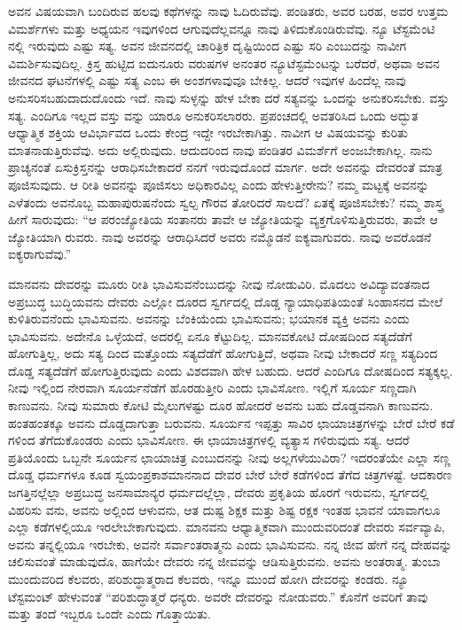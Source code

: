 ಅವನ ವಿಷಯವಾಗಿ ಬಂದಿರುವ ಹಲವು ಕಥೆಗಳನ್ನು ನಾವು ಓದಿರುವೆವು. ಪಂಡಿತರು, ಅವರ ಬರಹ, ಅವರ ಉತ್ತಮ ವಿಮರ್ಶೆಗಳು ಮತ್ತು ಅಧ್ಯಯನ ಇವುಗಳಿಂದ ಆಗುವುದೆಲ್ಲವನ್ನೂ ನಾವು ತಿಳಿದುಕೊಂಡಿರುವೆವು. ನ್ಯೂ ಟೆಸ್ಟಮೆಂಟಿ ನಲ್ಲಿ ಇರುವುದು ಎಷ್ಟು ಸತ್ಯ. ಅವನ ಜೀವನದಲ್ಲಿ ಚಾರಿತ್ರಿಕ ದೃಷ್ಟಿಯಿಂದ ಎಷ್ಟು ಸರಿ ಎಂಬುದನ್ನು ನಾವೀಗ ವಿಮರ್ಶಿಸುವುದಿಲ್ಲ. ಕ್ರಿಸ್ತ ಹುಟ್ಟಿದ ಐದುನೂರು ವರುಷಗಳ ಅನಂತರ ನ್ಯೂಟೆಸ್ಟಮೆಂಟನ್ನು ಬರೆದರೆ, ಅಥವಾ ಅವನ ಜೀವನದ ಘಟನೆಗಳಲ್ಲಿ ಎಷ್ಟು ಸತ್ಯ ಎಂಬ ಈ ಅಂಶಗಳಾವುವೂ ಬೇಕಿಲ್ಲ. ಆದರೆ ಇವುಗಳ ಹಿಂದೆಲ್ಲ ನಾವು ಅನುಸರಿಸಬಹುದಾದುದೊಂದು ಇದೆ. ನಾವು ಸುಳ್ಳನ್ನು ಹೇಳ ಬೇಕಾ ದರೆ ಸತ್ಯವನ್ನು ಒಂದನ್ನು ಅನುಕರಿಸಬೇಕು. ವಸ್ತು ಸತ್ಯ. ಎಂದಿಗೂ ಇಲ್ಲದ ವಸ್ತು ವನ್ನು ಯಾರೂ ಅನುಕರಿಸಲಾರರು. ಪ್ರಪಂಚದಲ್ಲಿ ಅವತರಿಸಿದ ಒಂದು ಅದ್ಭುತ ಆಧ್ಯಾತ್ಮಿಕ ಶಕ್ತಿಯ ಆವಿರ್ಭಾವದ ಒಂದು ಕೇಂದ್ರ ಇದ್ದೇ ಇರಬೇಕಾಗಿತ್ತು. ನಾವೀಗ ಆ ವಿಷಯವನ್ನು ಕುರಿತು ಮಾತನಾಡುತ್ತಿರುವೆವು. ಅದು ಅಲ್ಲಿರುವುದು. ಆದುದರಿಂದ ನಾವು ಪಂಡಿತರ ವಿಮರ್ಶೆಗೆ ಅಂಜಬೇಕಾಗಿಲ್ಲ. ನಾನು ಪ್ರಾಚ್ಯನಂತೆ ಏಸುಕ್ರಿಸ್ತನನ್ನು ಆರಾಧಿಸಬೇಕಾದರೆ ನನಗೆ ಇರುವುದೊಂದೆ ಮಾರ್ಗ. ಅದೇ ಅವನನ್ನು ದೇವರಂತೆ ಮಾತ್ರ ಪೂಜಿಸುವುದು. ಆ ರೀತಿ ಅವನನ್ನು ಪೂಜಿಸಲು ಅಧಿಕಾರವಿಲ್ಲ ಎಂದು ಹೇಳುತ್ತೀರೇನು? ನಮ್ಮ ಮಟ್ಟಕ್ಕೆ ಅವನನ್ನು ಎಳೆತಂದು ಅವನೊಬ್ಬ ಮಹಾಪುರುಷನೆಂದು ಸ್ವಲ್ಪ ಗೌರವ ತೋರಿದರೆ ಸಾಲದೆ? ಏತಕ್ಕೆ ಪೂಜಿಸಬೇಕು? ನಮ್ಮ ಶಾಸ್ತ್ರ ಹೀಗೆ ಸಾರುವುದು: “ಆ ಪರಂಜ್ಯೋತಿಯ ಸಂತಾನರು ತಾವೇ ಆ ಜ್ಯೋತಿಯನ್ನು ವ್ಯಕ್ತಗೊಳಿಸುತ್ತಿರುವರು, ತಾವೇ ಆ ಜ್ಯೋತಿಯಾಗಿ ರುವರು. ನಾವು ಅವರನ್ನು ಆರಾಧಿಸಿದರೆ ಅವರು ನಮ್ಮೊಡನೆ ಐಕ್ಯವಾಗುವರು. ನಾವು ಅವರೊಡನೆ ಐಕ್ಯರಾಗುವೆವು.”

ಮಾನವನು ದೇವರನ್ನು ಮೂರು ರೀತಿ ಭಾವಿಸುವನೆಂಬುದನ್ನು ನೀವು ನೋಡುವಿರಿ. ಮೊದಲು ಅವಿದ್ಯಾವಂತನಾದ ಅಪ್ರಬುದ್ಧ ಬುದ್ಧಿಯವನು ದೇವರು ಎಲ್ಲೋ ದೂರದ ಸ್ವರ್ಗದಲ್ಲಿ ದೊಡ್ಡ ನ್ಯಾಯಾಧಿಪತಿಯಂತೆ ಸಿಂಹಾಸನದ ಮೇಲೆ ಕುಳಿತಿರುವನೆಂದು ಭಾವಿಸುವನು. ಅವನನ್ನು ಬೆಂಕಿಯೆಂದು ಭಾವಿಸುವನು; ಭಯಾನಕ ವ್ಯಕ್ತಿ ಅವನು ಎಂದು ಭಾವಿಸುವನು. ಅದೇನೊ ಒಳ್ಳೆಯದೆ, ಅದರಲ್ಲಿ ಏನೂ ಕೆಟ್ಟುದಿಲ್ಲ. ಮಾನವಕೋಟಿ ದೋಷದಿಂದ ಸತ್ಯದೆಡೆಗೆ ಹೋಗುತ್ತಿಲ್ಲ, ಅದು ಸತ್ಯ ದಿಂದ ಮತ್ತೊಂದು ಸತ್ಯದೆಡೆಗೆ ಹೋಗುತ್ತಿದೆ, ಅಥವಾ ನೀವು ಬೇಕಾದರೆ ಸಣ್ಣ ಸತ್ಯದಿಂದ ದೊಡ್ಡ ಸತ್ಯದೆಡೆಗೆ ಹೋಗುತ್ತಿರುವುದು ಎಂದು ವಿಶದವಾಗಿ ಹೇಳ ಬಹುದು. ಆದರೆ ಎಂದಿಗೂ ದೋಷದಿಂದ ಸತ್ಯಕ್ಕಲ್ಲ. ನೀವು ಇಲ್ಲಿಂದ ನೇರವಾಗಿ ಸೂರ್ಯನೆಡೆಗೆ ಹೊರಡುತ್ತೀರಿ ಎಂದು ಭಾವಿಸೋಣ. ಇಲ್ಲಿಗೆ ಸೂರ್ಯ ಸಣ್ಣದಾಗಿ ಕಾಣುವನು. ನೀವು ಸುಮಾರು ಕೋಟಿ ಮೈಲುಗಳಷ್ಟು ದೂರ ಹೋದರೆ ಅವನು ಬಹು ದೊಡ್ಡವನಾಗಿ ಕಾಣುವನು. ಹಂತಹಂತಕ್ಕೂ ಅವನು ದೊಡ್ಡದಾಗುತ್ತಾ ಬರುವನು. ಸೂರ್ಯನ ಇಪ್ಪತ್ತು ಸಾವಿರ ಛಾಯಾಚಿತ್ರಗಳನ್ನು ಬೇರೆ ಬೇರೆ ಕಡೆ ಗಳಿಂದ ತೆಗೆದುಕೊಂಡರು ಎಂದು ಭಾವಿಸೋಣ. ಈ ಛಾಯಾಚಿತ್ರಗಳಲ್ಲಿ ವ್ಯತ್ಯಾಸ ಗಳಿರುವುದು ಸತ್ಯ. ಆದರೆ ಪ್ರತಿಯೊಂದು ಒಬ್ಬನೇ ಸೂರ್ಯನ ಛಾಯಾಚಿತ್ರ ಎಂಬುದನನ್ನು ನೀವು ಅಲ್ಲಗಳೆಯುವಿರಾ? ಇದರಂತೆಯೇ ಎಲ್ಲಾ ಸಣ್ಣ ದೊಡ್ಡ ಧರ್ಮಗಳೂ ಕೂಡ ಸ್ವಯಂಪ್ರಕಾಶಮಾನನಾದ ದೇವರ ಬೇರೆ ಬೇರೆ ಕಡೆಗಳಿಂದ ತೆಗೆದ ಚಿತ್ರಗಳಷ್ಟೆ. ಆದಕಾರಣ ಜಗತ್ತಿನಲ್ಲೆಲ್ಲಾ ಅಪ್ರಬುದ್ಧ ಜನಸಾಮಾನ್ಯರ ಧರ್ಮದಲ್ಲೆಲ್ಲಾ, ದೇವರು ಪ್ರಕೃತಿಯ ಹೊರಗೆ ಇರುವನು, ಸ್ವರ್ಗದಲ್ಲಿ ವಿಹರಿಸು ವನು, ಅವನು ಅಲ್ಲಿಂದ ಆಳುವನು, ಆತ ದುಷ್ಟ ಶಿಕ್ಷಕ ಮತ್ತು ಶಿಷ್ಟ ರಕ್ಷಕ ಇಂತಹ ಭಾವನೆ ಯಾವಾಗಲೂ ಎಲ್ಲಾ ಕಡೆಗಳಲ್ಲಿಯೂ ಇರಲೇಬೇಕಾಗುವುದು. ಮಾನವನು ಆಧ್ಯಾತ್ಮಿಕವಾಗಿ ಮುಂದುವರಿದಂತೆ ದೇವರು ಸರ್ವವ್ಯಾಪಿ, ಅವನು ತನ್ನಲ್ಲಿಯೂ ಇರಬೇಕು, ಅವನೇ ಸರ್ವಾಂತರಾತ್ಮನು ಎಂದು ಭಾವಿಸುವನು. ನನ್ನ ಜೀವ ಹೇಗೆ ನನ್ನ ದೇಹವನ್ನು ಚಲಿಸುವಂತೆ ಮಾಡುವುದೊ, ಹಾಗೆಯೇ ದೇವರು ನನ್ನ ಜೀವವನ್ನು ಆಡಿಸುತ್ತಿರುವನು. ಅವನು ಅಂತರಾತ್ಮ. ತುಂಬಾ ಮುಂದುವರಿದ ಕೆಲವರು, ಪರಿಶುದ್ಧಾತ್ಮರಾದ ಕೆಲವರು, ಇನ್ನೂ ಮುಂದೆ ಹೋಗಿ ದೇವರನ್ನು ಕಂಡರು. ನ್ಯೂ ಟೆಸ್ಟಮಂಟ್​ ಹೇಳುವಂತೆ “ಪರಿಶುದ್ಧಾತ್ಮರೆ ಧನ್ಯರು. ಅವರೇ ದೇವರನ್ನು ನೋಡುವರು.” ಕೊನೆಗೆ ಅವರಿಗೆ ತಾವು ಮತ್ತು ತಂದೆ ಇಬ್ಬರೂ ಒಂದೇ ಎಂದು ಗೊತ್ತಾಯಿತು.

